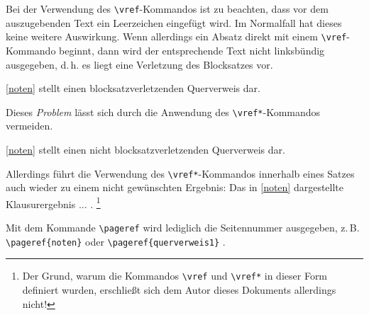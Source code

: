 Bei der Verwendung des \verb+\vref+-Kommandos ist zu beachten, dass vor dem auszugebenden Text ein Leerzeichen 
eingef\"ugt wird. Im Normalfall hat dieses keine weitere Auswirkung. Wenn allerdings ein Absatz direkt mit einem 
\verb+\vref+-Kommando beginnt, dann wird der entsprechende Text nicht linksb\"undig ausgegeben, d.\,h. es liegt 
eine Verletzung des Blocksatzes vor.%

\vref{noten} stellt einen blocksatzverletzenden Querverweis dar.

Dieses \textsl{Problem} l\"asst sich durch die Anwendung des \verb+\vref*+-Kommandos vermeiden.\label{vrefstern} 

\vref*{noten} stellt einen nicht blocksatzverletzenden Querverweis dar.

Allerdings f\"uhrt die Verwendung des \verb+\vref*+-Kommandos innerhalb eines Satzes auch wieder 
zu einem nicht gew\"unschten Ergebnis: Das in \vref*{noten} dargestellte Klausurergebnis ... .%
\footnote{Der Grund, warum die Kommandos \texttt{\textbackslash{}vref} 
und \texttt{\textbackslash{}vref*}
in dieser Form definiert wurden, erschlie{\ss}t sich dem Autor dieses Dokuments allerdings nicht!}

Mit dem Kommande \verb+\pageref+ wird lediglich die Seitennummer ausgegeben, z.\,B. \verb+\pageref{noten}+ \pageref{noten}
oder \verb+\pageref{querverweis1}+ \pageref{querverweis1}.

